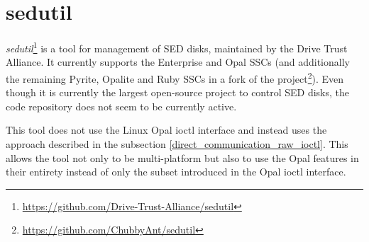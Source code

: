 
\section{sedutil}

\emph{sedutil}\footnote{\url{https://github.com/Drive-Trust-Alliance/sedutil}} is a tool for management of SED disks, maintained by the Drive Trust Alliance.
It currently supports the Enterprise and Opal SSCs (and additionally the remaining Pyrite, Opalite and Ruby SSCs in a fork of the project\footnote{\url{https://github.com/ChubbyAnt/sedutil}}).
Even though it is currently the largest open-source project to control SED disks, the code repository does not seem to be currently active.

This tool does not use the Linux Opal ioctl interface and instead uses the approach described in the subsection \ref{direct_communication_raw_ioctl}. This allows the tool not only to be multi-platform but also to use the Opal features in their entirety instead of only the subset introduced in the Opal ioctl interface.

